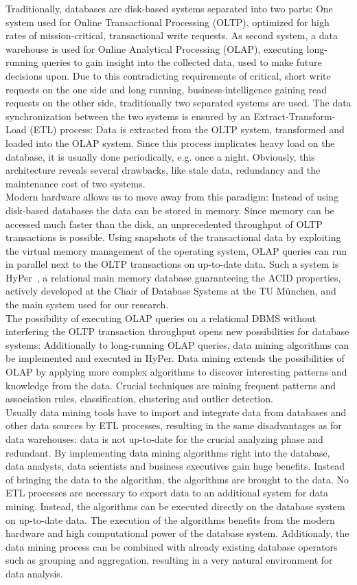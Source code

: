 Traditionally, databases are disk-based systems separated into two parts: One system used for Online Transactional Processing (OLTP), optimized for high rates of mission-critical, transactional write requests. As second system, a data warehouse is used for Online Analytical Processing (OLAP), executing long-running queries to gain insight into the  collected data, used to make future decisions upon. Due to this contradicting requirements of critical, short write requests on the one side and long running, business-intelligence gaining read requests on the other side, traditionally two separated systems are used. The data synchronization between the two systems is ensured by an Extract-Transform-Load (ETL) process: Data is extracted from the OLTP system, transformed and loaded into the OLAP system. Since this process implicates heavy load on the database, it is usually done periodically, e.g. once a night. Obviously, this architecture reveals several drawbacks, like stale data, redundancy and the maintenance cost of two systems.
\\
Modern hardware allows us to move away from this paradigm: Instead of using disk-based databases the data can be stored in memory. Since memory can be accessed much faster than the disk, an unprecedented throughput of OLTP transactions is possible. Using snapshots of the transactional data by exploiting the virtual memory management of the operating system, OLAP queries can run in parallel next to the OLTP transactions on up-to-date data. Such a system is HyPer~\parencite{5767867}, a relational main memory database guaranteeing the ACID properties, actively developed at the Chair of Database Systems at the TU München, and the main system used for our research. 
\\
The possibility of executing OLAP queries on a relational DBMS without interfering the OLTP transaction throughput opens new possibilities for database systems: Additionally to long-running OLAP queries, data mining algorithms can be implemented and executed in HyPer. Data mining extends the possibilities of OLAP by applying more complex algorithms to discover interesting patterns and knowledge from the data. Crucial techniques are mining frequent patterns and association rules, classification, clustering and outlier detection.
\\
Usually data mining tools have to import and integrate data from databases and other data sources by ETL processes, resulting in the same disadvantages as for data warehouses: data is not up-to-date for the crucial analyzing phase and redundant. 
By implementing data mining algorithms right into the database, data analysts, data scientists and business executives gain huge benefits. Instead of bringing the data to the algorithm, the algorithms are brought to the data. No ETL processes are necessary to export data to an additional system for data mining. Instead, the algorithms can be executed directly on the database system on up-to-date data. The execution of the algorithms benefits from the modern hardware and high computational power of the database system. Additionaly, the data mining process can be combined with already existing database operators such as grouping and aggregation, resulting in a very natural environment for data analysis.


